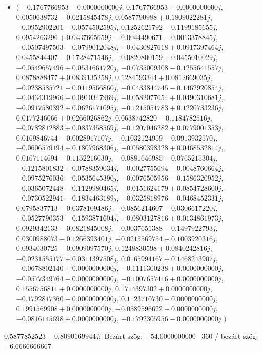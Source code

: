 \documentclass[14pt,a4paper]{article}
\begin{document}
\begin{itemize}
\item
$\big($
$-0.1767766953-0.0000000000j$, $0.1767766953+0.0000000000j$, $0.0050638732-0.0215845478j$, $0.0587790988+0.1809022281j$, $-0.0952902201-0.0574502595j$, $0.1252621792+0.1199185655j$, $0.0954263296+0.0437665659j$, $-0.0044490671-0.0013378845j$, $-0.0507497503-0.0799012048j$, $-0.0430827618+0.0917397464j$, $0.0455844407-0.1728471546j$, $-0.0820800159+0.0455010029j$, $-0.0549657496+0.0531661720j$, $-0.0735009308-0.1255641557j$, $0.0878888477+0.0839135258j$, $0.1284593344+0.0812669035j$, $-0.0238585721-0.0119566860j$, $-0.0433844745-0.1462920854j$, $-0.0434319966-0.0910347969j$, $-0.0582077654+0.0490310681j$, $-0.0917580392+0.0626171095j$, $-0.1215051783+0.1220733236j$, $0.0177246066+0.0266026862j$, $0.0638742820-0.1184782516j$, $-0.0782812883+0.0837358569j$, $-0.1207046282+0.0779001353j$, $0.0169846744-0.0028917107j$, $-0.1032124959-0.0913932570j$, $-0.0606579194+0.1807968306j$, $-0.0580398328+0.0468532814j$, $0.0167114694-0.1152216030j$, $-0.0881646985-0.0765215304j$, $-0.1215801832+0.0788359034j$, $-0.0027755694-0.0048760664j$, $-0.0975276036-0.0535645390j$, $-0.0076505956-0.1586320952j$, $-0.0365072448-0.1129980465j$, $-0.0151624179+0.0854728600j$, $-0.0730522941-0.1834463189j$, $-0.0325818976-0.0468452331j$, $0.0795837713-0.0378109486j$, $-0.0856214607-0.0306617220j$, $-0.0527790353-0.1593871604j$, $-0.0803127816+0.0134861973j$, $0.0929342133-0.0821845008j$, $-0.0037651388+0.1497922793j$, $0.0300988073-0.1266393401j$, $-0.0215569754+0.1003920316j$, $0.0934030725-0.0909097570j$, $0.1248830598+0.0840242816j$, $-0.0231555177+0.0311397508j$, $0.0165994167+0.1468243907j$, $-0.0678802140+0.0000000000j$, $-0.1111300238+0.0000000000j$, $-0.0577349764-0.0000000000j$, $-0.1007657416+0.0000000000j$, $0.1556756811+0.0000000000j$, $0.1714397302+0.0000000000j$, $-0.1792817360-0.0000000000j$, $0.1123710730-0.0000000000j$, $0.1991569908+0.0000000000j$, $-0.0589596622+0.0000000000j$, $-0.0816145698+0.0000000000j$, $-0.1792305956-0.0000000000j$
$\big)$
\end{itemize}
$0.5877852523-0.8090169944j$:\
Bezárt szög: $-54.0000000000$ \
360 / bezárt szög: $-6.6666666667$\
\end{document}
